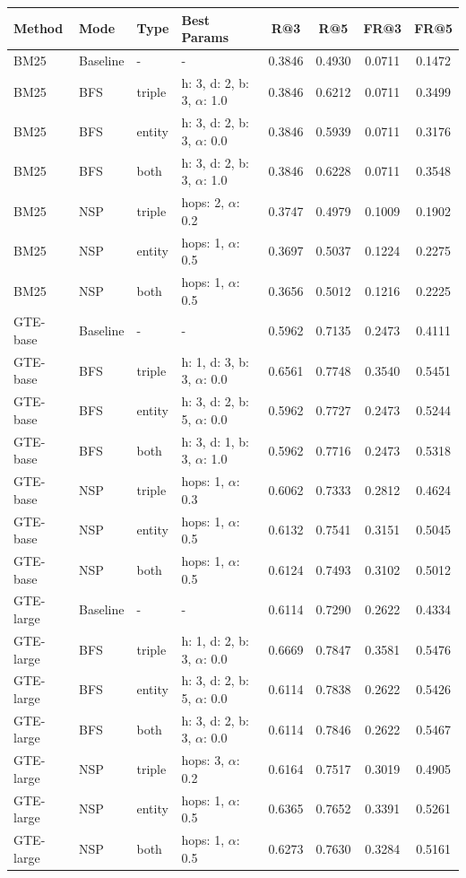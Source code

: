 \documentclass[11pt]{article}
\begin{document}
\begin{table}[t]
\centering
\footnotesize
\begin{tabular}{llllcccc}
\toprule
\textbf{Method} & \textbf{Mode} & \textbf{Type} & \textbf{Best Params} & \textbf{R@3} & \textbf{R@5} & \textbf{FR@3} & \textbf{FR@5} \\
\midrule

BM25 & Baseline & - & - & 0.3846 & 0.4930 & 0.0711 & 0.1472 \\
BM25 & BFS & triple & h: 3, d: 2, b: 3, $\alpha$: 1.0 & 0.3846 & 0.6212 & 0.0711 & 0.3499 \\
BM25 & BFS & entity & h: 3, d: 2, b: 3, $\alpha$: 0.0 & 0.3846 & 0.5939 & 0.0711 & 0.3176 \\
BM25 & BFS & both & h: 3, d: 2, b: 3, $\alpha$: 1.0 & 0.3846 & 0.6228 & 0.0711 & 0.3548 \\
BM25 & NSP & triple & hops: 2, $\alpha$: 0.2 & 0.3747 & 0.4979 & 0.1009 & 0.1902 \\
BM25 & NSP & entity & hops: 1, $\alpha$: 0.5 & 0.3697 & 0.5037 & 0.1224 & 0.2275 \\
BM25 & NSP & both & hops: 1, $\alpha$: 0.5 & 0.3656 & 0.5012 & 0.1216 & 0.2225 \\

GTE-base & Baseline & - & - & 0.5962 & 0.7135 & 0.2473 & 0.4111 \\
GTE-base & BFS & triple & h: 1, d: 3, b: 3, $\alpha$: 0.0 & 0.6561 & 0.7748 & 0.3540 & 0.5451 \\
GTE-base & BFS & entity & h: 3, d: 2, b: 5, $\alpha$: 0.0 & 0.5962 & 0.7727 & 0.2473 & 0.5244 \\
GTE-base & BFS & both & h: 3, d: 1, b: 3, $\alpha$: 1.0 & 0.5962 & 0.7716 & 0.2473 & 0.5318 \\
GTE-base & NSP & triple & hops: 1, $\alpha$: 0.3 & 0.6062 & 0.7333 & 0.2812 & 0.4624 \\
GTE-base & NSP & entity & hops: 1, $\alpha$: 0.5 & 0.6132 & 0.7541 & 0.3151 & 0.5045 \\
GTE-base & NSP & both & hops: 1, $\alpha$: 0.5 & 0.6124 & 0.7493 & 0.3102 & 0.5012 \\

GTE-large & Baseline & - & - & 0.6114 & 0.7290 & 0.2622 & 0.4334 \\
GTE-large & BFS & triple & h: 1, d: 2, b: 3, $\alpha$: 0.0 & 0.6669 & 0.7847 & 0.3581 & 0.5476 \\
GTE-large & BFS & entity & h: 3, d: 2, b: 5, $\alpha$: 0.0 & 0.6114 & 0.7838 & 0.2622 & 0.5426 \\
GTE-large & BFS & both & h: 3, d: 2, b: 3, $\alpha$: 0.0 & 0.6114 & 0.7846 & 0.2622 & 0.5467 \\
GTE-large & NSP & triple & hops: 3, $\alpha$: 0.2 & 0.6164 & 0.7517 & 0.3019 & 0.4905 \\
GTE-large & NSP & entity & hops: 1, $\alpha$: 0.5 & 0.6365 & 0.7652 & 0.3391 & 0.5261 \\
GTE-large & NSP & both & hops: 1, $\alpha$: 0.5 & 0.6273 & 0.7630 & 0.3284 & 0.5161 \\


\end{tabular}
\end{table}
\end{document}

